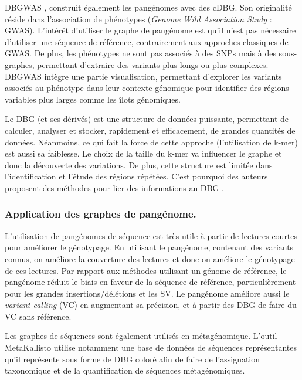 DBGWAS \cite{jaillard_fast_2018}, construit également les pangénomes avec des cDBG. Son originalité réside dans l'association de phénotypes (\textit{Genome Wild Association Study} : GWAS). L'intérêt d'utiliser le graphe de pangénome est qu'il n'est pas nécessaire d'utiliser une séquence de référence, contrairement aux approches classiques de GWAS. De plus, les phénotypes ne sont pas associés à des SNPs mais à des sous-graphes, permettant d'extraire des variants plus longs ou plus complexes. DBGWAS intègre une partie visualisation, permettant d'explorer les variants associés au phénotype dans leur contexte génomique pour identifier des régions variables plus larges comme les îlots génomiques. 

Le DBG (et ses dérivés) est une structure de données puissante, permettant de calculer, analyser et stocker, rapidement et efficacement, de grandes quantités de données. Néanmoins, ce qui fait la force de cette approche (l'utilisation de k-mer) est aussi sa faiblesse. Le choix de la taille du k-mer va influencer le graphe et donc la découverte des variations. De plus, cette structure est limitée dans l'identification et l'étude des régions répétées. C'est pourquoi des auteurs proposent des méthodes pour lier des informations au DBG \cite{turner_integrating_2018}.

\subsubsection{Application des graphes de pangénome.}

L'utilisation de pangénomes de séquence est très utile à partir de lectures courtes pour améliorer le génotypage. En utilisant le pangénome, contenant des variants connus, on améliore la couverture des lectures et donc on améliore le génotypage de ces lectures. Par rapport aux méthodes utilisant un génome de référence, le pangénome réduit le biais en faveur de la séquence de référence, particulièrement pour les grandes insertions/délétions et les SV. Le pangénome améliore aussi le \textit{variant calling} (VC) en augmentant sa précision, et à partir des DBG de faire du VC sans référence.

Les graphes de séquences sont également utilisés en métagénomique. L'outil MetaKallisto \cite{schaeffer_pseudoalignment_2017} utilise notamment une base de données de séquences représentantes qu'il représente sous forme de DBG coloré afin de faire de l'assignation taxonomique et de la quantification de séquences métagénomiques.

